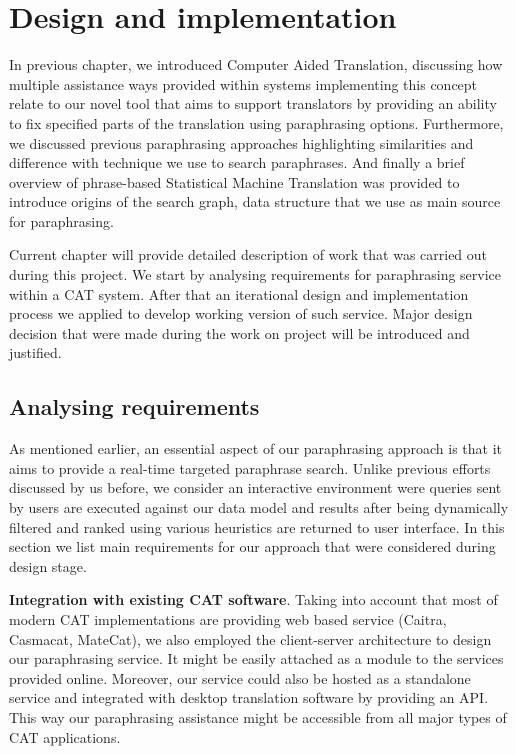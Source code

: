 \chapter{Design and implementation}

In previous chapter, we introduced Computer Aided Translation, discussing how multiple assistance ways provided within systems implementing this concept  relate to our novel tool that aims to support translators by providing an ability to fix specified parts of the translation using paraphrasing options. Furthermore, we discussed previous paraphrasing approaches highlighting similarities and difference with technique we use to search paraphrases. And finally a brief overview of phrase-based Statistical Machine Translation was provided to introduce origins of the search graph, data structure that we use as main source for paraphrasing.

Current chapter will provide detailed description of work that was carried out during this project. We start by analysing requirements for paraphrasing service within a CAT system. After that an iterational design and implementation process we applied to develop working version of such service. Major design decision that were made during the work on project will be introduced and justified. 

\section{Analysing requirements}

As mentioned earlier, an essential aspect of our paraphrasing approach is that it aims to provide a real-time targeted paraphrase search. Unlike previous efforts discussed by us before, we consider an interactive environment were queries sent by users are executed against our data model and results after being dynamically filtered and ranked using various heuristics are returned to user interface. In this section we list main requirements for our approach that were considered during design stage.

\textbf{Integration with existing CAT software}. Taking into account that most of modern CAT implementations are providing web based service (Caitra, Casmacat, MateCat), we also employed the client-server architecture to design our paraphrasing service. It might be easily attached as a module to the services provided online. Moreover, our service could also be hosted as a standalone service and integrated with desktop translation software by providing an API. This way our paraphrasing assistance might be accessible from all major types of CAT applications.

